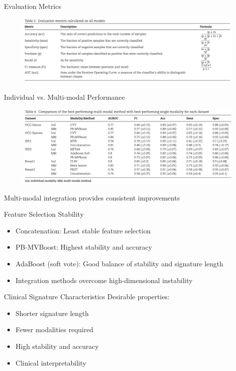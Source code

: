 \documentclass{beamer}
\begin{document}
\begin{frame}{Evaluation Metrics}
\begin{figure}[H]
  \centering
  \includegraphics[width=1\textwidth]{assets/evaluation_metrics.png}
\end{figure}
\end{frame}

\begin{frame}{Individual vs. Multi-modal Performance}
\begin{figure}[H]
  \centering
  \includegraphics[width=1\textwidth]{assets/ind_mm.png}
\end{figure}

\alert{Multi-modal integration provides consistent improvements}
\end{frame}

\begin{frame}{Feature Selection Stability}
\begin{itemize}
\item \alert{Concatenation}: Least stable feature selection
\item \alert{PB-MVBoost}: Highest stability and accuracy
\item \alert{AdaBoost (soft vote)}: Good balance of stability and signature length
\item Integration methods overcome high-dimensional instability
\end{itemize}

\begin{block}{Clinical Signature Characteristics}
Desirable properties:
\begin{itemize}
\item Shorter signature length
\item Fewer modalities required
\item High stability and accuracy
\item Clinical interpretability
\end{itemize}
\end{block}
\end{frame}
\end{document}
